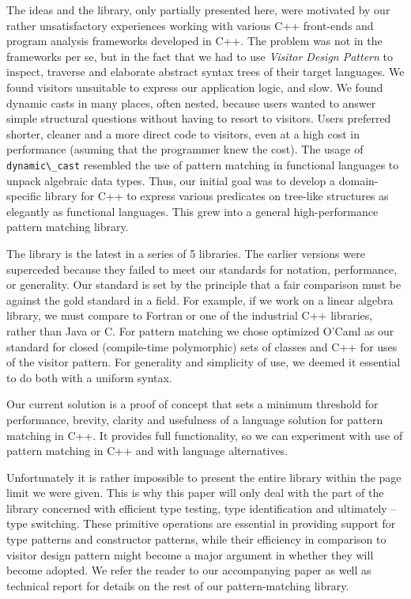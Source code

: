 \documentclass[preprint]{sigplanconf}
\makeatletter
\DeclareRobustCommand{\code}[1]{{\lstinline[breaklines=false,escapechar=@]{#1}}}
\makeatother
\begin{document}
The ideas and the library, only partially presented here, were motivated by our 
rather unsatisfactory experiences working with various C++ front-ends and 
program analysis frameworks developed in C++\cite{Pivot09,Phoenix,Clang,Lise}. 
The problem was not in the frameworks per se, but in the fact that we had to use
\emph{Visitor Design Pattern}\cite{DesignPatterns1993} to inspect, traverse and 
elaborate abstract syntax trees of their target languages. We found visitors 
unsuitable to express our application logic, and slow. We found dynamic casts in 
many places, often nested, because users wanted to answer simple structural 
questions without having to resort to visitors. Users preferred shorter, cleaner 
and a more direct code to visitors, even at a high cost in performance (asuming 
that the programmer knew the cost). The usage of \code{dynamic\_cast} resembled 
the use of pattern matching in functional languages to unpack algebraic data 
types. Thus, our initial goal was to develop a domain-specific library for C++ 
to express various predicates on tree-like structures as elegantly as functional 
languages. This grew into a general high-performance pattern matching library.

The library is the latest in a series of 5 libraries. The earlier versions were 
superceded because they failed to meet our standards for notation, performance, 
or generality. Our standard is set by the principle that a fair comparison must 
be against the gold standard in a field. For example, if we work on a linear 
algebra library, we must compare to Fortran or one of the industrial C++ 
libraries, rather than Java or C. For pattern matching we chose optimized O'Caml 
as our standard for closed (compile-time polymorphic) sets of classes and C++ 
for uses of the visitor pattern. For generality and simplicity of use, we deemed 
it essential to do both with a uniform syntax.

Our current solution is a proof of concept that sets a minimum threshold for 
performance, brevity, clarity and usefulness of a language solution for pattern 
matching in C++. It provides full functionality, so we can experiment with use 
of pattern matching in C++ and with language alternatives. 

Unfortunately it is rather impossible to present the entire library within the 
page limit we were given. This is why this paper will only deal with the part of 
the library concerned with efficient type testing, type identification and 
ultimately -- type switching. These primitive operations are essential in 
providing support for type patterns and constructor patterns, while their 
efficiency in comparison to visitor design pattern might become a major argument 
in whether they will become adopted. We refer the reader to our accompanying 
paper as well as technical report for details on the rest of our 
pattern-matching library.
\end{document}
